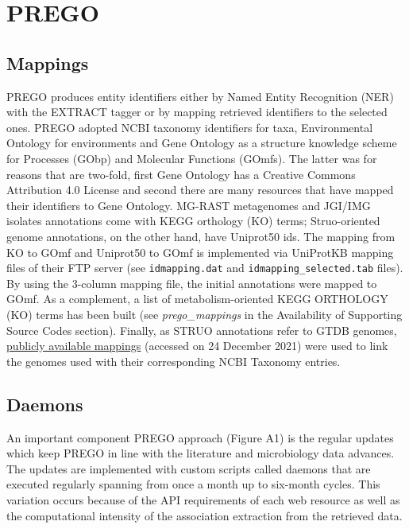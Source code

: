 \chapter{PREGO}

\section{Mappings}
\label{app:A}


PREGO produces entity identifiers either by Named Entity Recognition (NER) with the EXTRACT tagger or by mapping retrieved identifiers to the selected ones. 
PREGO adopted NCBI taxonomy identifiers for taxa, Environmental Ontology for environments and Gene Ontology as a structure knowledge scheme for Processes (GObp) and Molecular Functions (GOmfs). 
The latter was for reasons that are two-fold, first Gene Ontology has a Creative Commons Attribution 4.0 License and second there are many resources that have mapped their identifiers to Gene Ontology.
MG-RAST metagenomes and JGI/IMG isolates annotations come with KEGG orthology (KO) terms; 
Struo-oriented genome annotations, on the other hand, have Uniprot50 ids. 
The mapping from KO to GOmf and Uniprot50 to GOmf is implemented via UniProtKB mapping files of their FTP server (see \texttt{idmapping.dat} and \texttt{idmapping\_selected.tab} files). 
By using the 3-column mapping file, the initial annotations were mapped to GOmf. As a complement, a list of metabolism-oriented KEGG ORTHOLOGY (KO) terms has been built (see \textit{prego\_mappings} in the Availability of Supporting Source Codes section).
Finally, as STRUO annotations refer to GTDB genomes, \href{http://ftp.tue.mpg.de/ebio/projects/struo/GTDB_release89/metadata/}{publicly available mappings} (accessed on 24 December 2021) were used to link the genomes used with their corresponding NCBI Taxonomy entries.



\section{Daemons}
\label{app:B}

An important component PREGO approach (Figure A1) is the regular updates which keep PREGO in line with the literature and microbiology data advances. 
The updates are implemented with custom scripts called daemons that are executed regularly spanning from once a month up to six-month cycles. 
This variation occurs because of the API requirements of each web resource as well as the computational intensity of the association extraction from the retrieved data.

